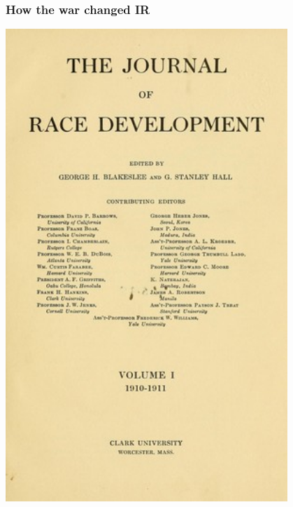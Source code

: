 \documentclass[aspectratio=43]{beamer}
\begin{document}
\begin{frame}
\frametitle{How the war changed IR}
\centering

\begin{minipage}{0.49\textwidth}\centering
  \includegraphics[width = 0.8\textwidth]{img/journal_race_dev}
\end{minipage}\hfill
\begin{minipage}{0.49\textwidth}\centering

\end{minipage}
\end{frame}
\end{document}
